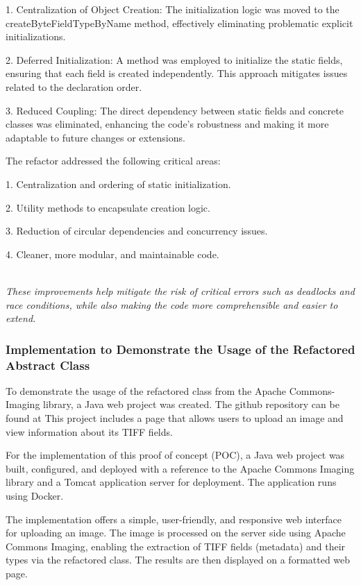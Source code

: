 \documentclass[sigconf]{acmart}
\begin{document}
    1. Centralization of Object Creation:
The initialization logic was moved to the createByteFieldTypeByName method, effectively eliminating problematic explicit initializations.

    2. Deferred Initialization:
A method was employed to initialize the static fields, ensuring that each field is created independently. This approach mitigates issues related to the declaration order.

    3. Reduced Coupling:
The direct dependency between static fields and concrete classes was eliminated, enhancing the code's robustness and making it more adaptable to future changes or extensions.

The refactor addressed the following critical areas:

1. Centralization and ordering of static initialization.
    
2. Utility methods to encapsulate creation logic.
    
3. Reduction of circular dependencies and concurrency issues.
    
4. Cleaner, more modular, and maintainable code.

\hfill\\
\textit{These improvements help mitigate the risk of critical errors such as deadlocks and race conditions, while also making the code more comprehensible and easier to extend.}\cite{REF.Commit-088c26d}

\subsubsection{Implementation to Demonstrate the Usage of the Refactored Abstract Class}

To demonstrate the usage of the refactored class from the Apache Commons-Imaging library, a Java web project was created. The github repository can be found at \cite{websiteswd} This project includes a page that allows users to upload an image and view information about its TIFF fields.

For the implementation of this proof of concept (POC), a Java web project was built, configured, and deployed with a reference to the Apache Commons Imaging library and a Tomcat application server for deployment. The application runs using Docker.

The implementation offers a simple, user-friendly, and responsive web interface for uploading an image. The image is processed on the server side using Apache Commons Imaging, enabling the extraction of TIFF fields (metadata) and their types via the refactored class. The results are then displayed on a formatted web page.
\end{document}
